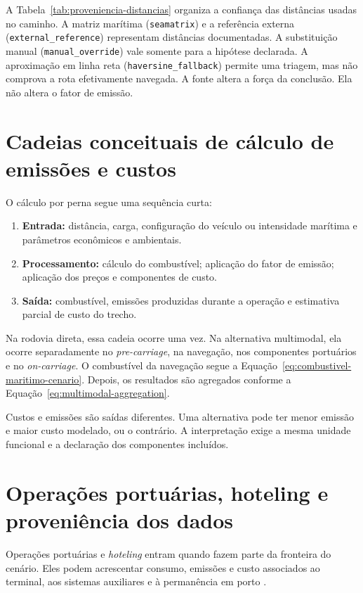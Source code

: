 A Tabela~\ref{tab:proveniencia-distancias} organiza a confiança das distâncias usadas no caminho. A matriz marítima (\texttt{seamatrix}) e a referência externa (\texttt{external\_reference}) representam distâncias documentadas. A substituição manual (\texttt{manual\_override}) vale somente para a hipótese declarada. A aproximação em linha reta (\texttt{haversine\_fallback}) permite uma triagem, mas não comprova a rota efetivamente navegada. A fonte altera a força da conclusão. Ela não altera o fator de emissão.

\section{Cadeias conceituais de cálculo de emissões e custos}
\label{sec:cadeias-calculo}

O cálculo por perna segue uma sequência curta:

\begin{enumerate}
  \item \textbf{Entrada:} distância, carga, configuração do veículo ou intensidade marítima e parâmetros econômicos e ambientais.
  \item \textbf{Processamento:} cálculo do combustível; aplicação do fator de emissão; aplicação dos preços e componentes de custo.
  \item \textbf{Saída:} combustível, emissões produzidas durante a operação e estimativa parcial de custo do trecho.
\end{enumerate}

Na rodovia direta, essa cadeia ocorre uma vez. Na alternativa multimodal, ela ocorre separadamente no \emph{pre-carriage}, na navegação, nos componentes portuários e no \emph{on-carriage}. O combustível da navegação segue a Equação~\ref{eq:combustivel-maritimo-cenario}. Depois, os resultados são agregados conforme a Equação~\ref{eq:multimodal-aggregation}.

Custos e emissões são saídas diferentes. Uma alternativa pode ter menor emissão e maior custo modelado, ou o contrário. A interpretação exige a mesma unidade funcional e a declaração dos componentes incluídos.

\section{Operações portuárias, hoteling e proveniência dos dados}
\label{sec:portops-metodologia}

Operações portuárias e \emph{hoteling} entram quando fazem parte da fronteira do cenário. Eles podem acrescentar consumo, emissões e custo associados ao terminal, aos sistemas auxiliares e à permanência em porto \cite{berth2009,shipops2022,decarb2024}.

